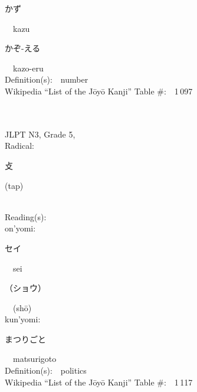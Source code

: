 \begin{multicols}{2}
{\hspace*{2em}}{\begin{CJK}{UTF8}{min} かず \end{CJK}}\ \ kazu\ \ \\
{\hspace*{2em}}{\begin{CJK}{UTF8}{min} かぞ-える \end{CJK}}\ \ kazo-eru\ \ \\
Definition(s):\ \ number \\
Wikipedia ``List of the J\=oy\=o Kanji'' Table \#:\ \ 1\,097 \\
\ \ \\
{\fontsize{34pt}{40pt}  }\ \ \\  %
{JLPT N3, Grade 5, \\Radical:\ \ {\begin{CJK}{UTF8}{min} 攴 \end{CJK}} (tap) } \\
Reading(s):\ \ \\
{\hspace*{1em}}on'yomi:\ \ \\
{\hspace*{2em}}{\begin{CJK}{UTF8}{min} セイ \end{CJK}}\ \ sei\ \ \\
{\hspace*{2em}}{\begin{CJK}{UTF8}{min} （ショウ） \end{CJK}}\ \ (sh\=o)\ \ \\
{\hspace*{1em}}kun'yomi:\ \ \\
{\hspace*{2em}}{\begin{CJK}{UTF8}{min} まつりごと \end{CJK}}\ \ matsurigoto\ \ \\
Definition(s):\ \ politics \\
Wikipedia ``List of the J\=oy\=o Kanji'' Table \#:\ \ 1\,117 \\
\ \ \\
{\fontsize{34pt}{40pt}  }\ \ \\  %

\end{multicols}
